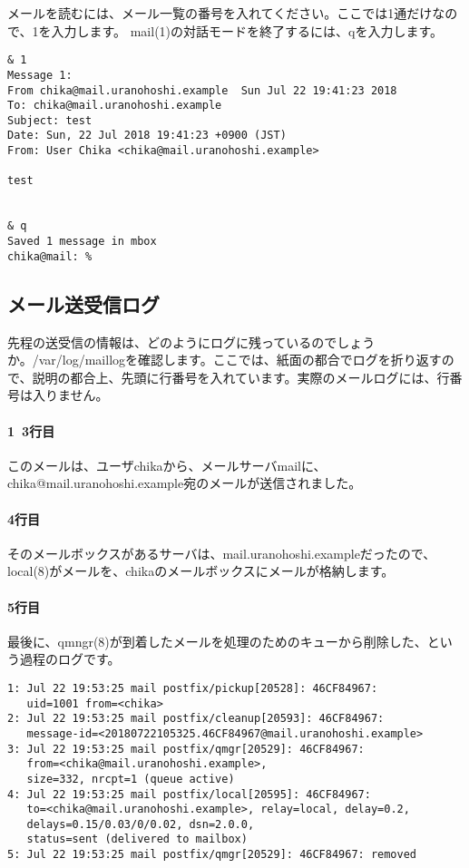 メールを読むには、メール一覧の番号を入れてください。ここでは1通だけなので、1を入力します。
mail(1)の対話モードを終了するには、qを入力します。

\begin{verbatim}
& 1
Message 1:
From chika@mail.uranohoshi.example  Sun Jul 22 19:41:23 2018
To: chika@mail.uranohoshi.example
Subject: test
Date: Sun, 22 Jul 2018 19:41:23 +0900 (JST)
From: User Chika <chika@mail.uranohoshi.example>

test


& q
Saved 1 message in mbox
chika@mail: %
\end{verbatim}


\subsection{メール送受信ログ}
先程の送受信の情報は、どのようにログに残っているのでしょうか。/var/log/maillogを確認します。ここでは、紙面の都合でログを折り返すので、説明の都合上、先頭に行番号を入れています。実際のメールログには、行番号は入りません。

\paragraph{1~3行目}
このメールは、ユーザchikaから、メールサーバmailに、chika@mail.uranohoshi.example宛のメールが送信されました。

\paragraph{4行目}
そのメールボックスがあるサーバは、mail.uranohoshi.exampleだったので、local(8)がメールを、chikaのメールボックスにメールが格納します。

\paragraph{5行目}
最後に、qmngr(8)が到着したメールを処理のためのキューから削除した、という過程のログです。

\begin{verbatim}
1: Jul 22 19:53:25 mail postfix/pickup[20528]: 46CF84967: 
   uid=1001 from=<chika>
2: Jul 22 19:53:25 mail postfix/cleanup[20593]: 46CF84967:
   message-id=<20180722105325.46CF84967@mail.uranohoshi.example>
3: Jul 22 19:53:25 mail postfix/qmgr[20529]: 46CF84967:  
   from=<chika@mail.uranohoshi.example>, 
   size=332, nrcpt=1 (queue active)
4: Jul 22 19:53:25 mail postfix/local[20595]: 46CF84967:
   to=<chika@mail.uranohoshi.example>, relay=local, delay=0.2,
   delays=0.15/0.03/0/0.02, dsn=2.0.0, 
   status=sent (delivered to mailbox)
5: Jul 22 19:53:25 mail postfix/qmgr[20529]: 46CF84967: removed
\end{verbatim}


